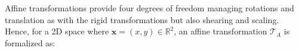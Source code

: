 %
%

Affine transformations provide four degrees of freedom managing rotations and translation as with the rigid transformations but also shearing and scaling. Hence, for a 2D space where $\mathbf{x} = (x,y) \in \mathbb{R}^2$, an affine transformation $\mathcal{T}_A$ is formalized as: 

